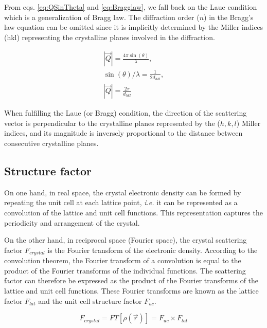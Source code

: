 From eqs. \ref{eq:QSinTheta} and \ref{eq:Bragglaw}, we fall back on the Laue condition which is a generalization of Bragg law. The diffraction order ($n$) in the Bragg's law equation can be omitted since it is implicitly determined by the Miller indices (hkl) representing the crystalline planes involved in the diffraction.

\begin{gather}
    \label{eq:QandD}
    |\vec{Q}| = \frac{4\pi \sin(\theta)}{\lambda},\\
    \sin(\theta) / \lambda = \frac{1}{2d_{hkl}},\\
    |\vec{Q}| = \frac{2\pi}{d_{hkl}}
\end{gather}{}

When fulfilling the Laue (or Bragg) condition, the direction of the scattering vector is perpendicular to the crystalline planes represented by the ($h, k, l$) Miller indices, and its magnitude is inversely proportional to the distance between consecutive crystalline planes.

\subsection{Structure factor}

On one hand, in real space, the crystal electronic density can be formed by repeating the unit cell at each lattice point, \textit{i.e.} it can be represented as a convolution of the lattice and unit cell functions.
This representation captures the periodicity and arrangement of the crystal.

On the other hand, in reciprocal space (Fourier space), the crystal scattering factor $F_{crystal}$ is the Fourier transform of the electronic density.
According to the convolution theorem, the Fourier transform of a convolution is equal to the product of the Fourier transforms of the individual functions.
The scattering factor can therefore be expressed as the product of the Fourier transforms of the lattice and unit cell functions.
These Fourier transforms are known as the lattice factor $F_{lat}$ and the unit cell structure factor $F_{uc}$.

\begin{equation}
    F_{crystal} = FT[\rho(\vec{r})] = F_{uc} \times F_{lat}
    \label{eq:FcrystalFlatFuc}
\end{equation}

